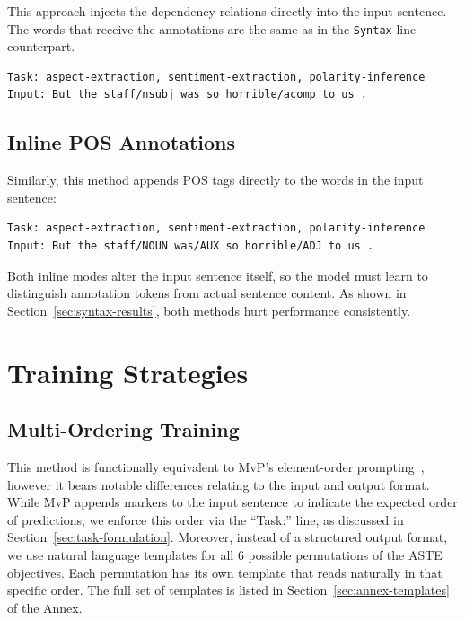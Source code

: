 \documentclass[12pt,a4paper]{report}
\begin{document}
This approach injects the dependency relations directly into the input sentence. The words that receive
the annotations are the same as in the \texttt{Syntax} line counterpart. 

\begin{lstlisting}
Task: aspect-extraction, sentiment-extraction, polarity-inference
Input: But the staff/nsubj was so horrible/acomp to us .
\end{lstlisting}

\subsection{Inline POS Annotations}

Similarly, this method appends POS tags directly to the words in the input sentence:

\begin{lstlisting}
Task: aspect-extraction, sentiment-extraction, polarity-inference
Input: But the staff/NOUN was/AUX so horrible/ADJ to us .
\end{lstlisting}

Both inline modes alter the input sentence itself, so the model must learn to 
distinguish annotation tokens from actual sentence content. 
As shown in Section~\ref{sec:syntax-results}, both methods hurt performance consistently.


\section{Training Strategies}\label{sec:training-strategies}

\subsection{Multi-Ordering Training}

This method is functionally equivalent to MvP's element-order prompting~\cite{gou2023mvp}, however it 
bears notable differences relating to the input and output format. While MvP appends markers to 
the input sentence to indicate the expected order of predictions, we enforce this order via the
``Task:'' line, as discussed in Section~\ref{sec:task-formulation}. Moreover, instead of a structured output format, we use natural language templates for 
all 6 possible permutations of the ASTE objectives. Each permutation has its own template 
that reads naturally in that specific order. 
The full set of templates is listed in Section~\ref{sec:annex-templates} of the Annex.
\end{document}

